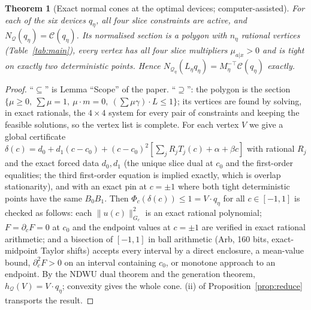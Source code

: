 \documentclass[11pt]{article}
\newtheorem{theorem}{Theorem}
\theoremstyle{definition}\newtheorem{definition}{Definition}
\theoremstyle{remark}\newtheorem{remark}{Remark}
\newcommand{\Q}{\mathcal Q}
\begin{document}
\begin{theorem}[Exact normal cones at the optimal devices; computer-assisted]\label{thm:cones}
For each of the six devices $q_\eta$, all four slice constraints are active, and $N_\Q(q_\eta)=\mathcal C(q_\eta)$. Its normalised section is a polygon with $n_\eta$ rational vertices (Table~\ref{tab:main}), every vertex has all four slice multipliers $\mu_{a|x}>0$ and is tight on exactly two deterministic points. Hence $N_{\Q_\eta}(L_\eta q_\eta)=M_\eta^{-\top}\mathcal C(q_\eta)$ exactly.
\end{theorem}
\begin{proof}
``$\subseteq$'' is Lemma ``Scope'' of the paper. ``$\supseteq$'': the polygon is the section $\{\mu\ge0,\ \sum\mu=1,\ \mu\cdot m=0,\ (\sum\mu\gamma)\cdot L\le1\}$; its vertices are found by solving, in exact rationals, the $4\times4$ system for every pair of constraints and keeping the feasible solutions, so the vertex list is complete. For each vertex $V$ we give a global certificate $\delta(c)=d_0+d_1(c-c_0)+(c-c_0)^2[\sum_jR_jT_j(c)+\alpha+\beta c]$ with rational $R_j$ and the exact forced data $d_0,d_1$ (the unique slice dual at $c_0$ and the first-order equalities; the third first-order equation is implied exactly, which is overlap stationarity), and with an exact pin at $c=\pm1$ where both tight deterministic points have the same $B_0B_1$. Then $\Phi_c(\delta(c))\le1=V\cdot q_\eta$ for all $c\in[-1,1]$ is checked as follows: each $\|u(c)\|_{G_c}^2$ is an exact rational polynomial; $F=\partial_cF=0$ at $c_0$ and the endpoint values at $c=\pm1$ are verified in exact rational arithmetic; and a bisection of $[-1,1]$ in ball arithmetic (Arb, 160 bits, exact-midpoint Taylor shifts) accepts every interval by a direct enclosure, a mean-value bound, $\partial_c^2F>0$ on an interval containing $c_0$, or monotone approach to an endpoint. By the NDWU dual theorem and the generation theorem, $h_\Q(V)=V\cdot q_\eta$; convexity gives the whole cone. (ii) of Proposition~\ref{prop:reduce} transports the result.
\end{proof}
\end{document}
